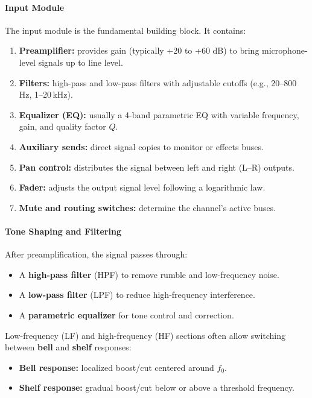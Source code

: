 \paragraph{Input Module}
The input module is the fundamental building block. It contains:
\begin{enumerate}
  \item \textbf{Preamplifier:} provides gain (typically +20 to +60 dB) to bring microphone-level signals up to line level.
  \item \textbf{Filters:} high-pass and low-pass filters with adjustable cutoffs (e.g., 20–800\,Hz, 1–20\,kHz).
  \item \textbf{Equalizer (EQ):} usually a 4-band parametric EQ with variable frequency, gain, and quality factor $Q$.
  \item \textbf{Auxiliary sends:} direct signal copies to monitor or effects buses.
  \item \textbf{Pan control:} distributes the signal between left and right (L–R) outputs.
  \item \textbf{Fader:} adjusts the output signal level following a logarithmic law.
  \item \textbf{Mute and routing switches:} determine the channel’s active buses.
\end{enumerate}


\paragraph{Tone Shaping and Filtering}
After preamplification, the signal passes through:
\begin{itemize}
  \item A \textbf{high-pass filter} (HPF) to remove rumble and low-frequency noise.
  \item A \textbf{low-pass filter} (LPF) to reduce high-frequency interference.
  \item A \textbf{parametric equalizer} for tone control and correction.
\end{itemize}

Low-frequency (LF) and high-frequency (HF) sections often allow switching between \textbf{bell} and \textbf{shelf} responses:
\begin{itemize}
  \item \textbf{Bell response:} localized boost/cut centered around $f_0$.
  \item \textbf{Shelf response:} gradual boost/cut below or above a threshold frequency.
\end{itemize}

